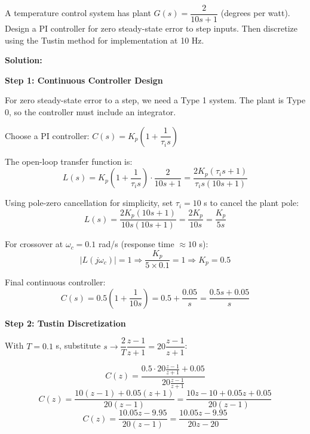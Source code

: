 \begin{example}
\label{ex:complete_design}
A temperature control system has plant $G(s) = \dfrac{2}{10s + 1}$ (degrees per watt). Design a PI controller for zero steady-state error to step inputs. Then discretize using the Tustin method for implementation at 10 Hz.

\textbf{Solution:}

\textbf{Step 1: Continuous Controller Design}

For zero steady-state error to a step, we need a Type 1 system. The plant is Type 0, so the controller must include an integrator.

Choose a PI controller: $C(s) = K_p\left(1 + \dfrac{1}{\tau_i s}\right)$

The open-loop transfer function is:
\begin{equation*}
L(s) = K_p\left(1 + \frac{1}{\tau_i s}\right) \cdot \frac{2}{10s + 1} = \frac{2K_p(\tau_i s + 1)}{\tau_i s(10s + 1)}
\end{equation*}

Using pole-zero cancellation for simplicity, set $\tau_i = 10$ s to cancel the plant pole:
\begin{equation*}
L(s) = \frac{2K_p(10s + 1)}{10s(10s + 1)} = \frac{2K_p}{10s} = \frac{K_p}{5s}
\end{equation*}

For crossover at $\omega_c = 0.1$ rad/s (response time $\approx 10$ s):
\begin{equation*}
|L(j\omega_c)| = 1 \Rightarrow \frac{K_p}{5 \times 0.1} = 1 \Rightarrow K_p = 0.5
\end{equation*}

Final continuous controller:
\begin{equation*}
C(s) = 0.5\left(1 + \frac{1}{10s}\right) = 0.5 + \frac{0.05}{s} = \frac{0.5s + 0.05}{s}
\end{equation*}

\textbf{Step 2: Tustin Discretization}

With $T = 0.1$ s, substitute $s \rightarrow \dfrac{2}{T}\dfrac{z-1}{z+1} = 20\dfrac{z-1}{z+1}$:

\begin{equation*}
C(z) = \frac{0.5 \cdot 20\frac{z-1}{z+1} + 0.05}{20\frac{z-1}{z+1}}
\end{equation*}
\begin{equation*}
C(z) = \frac{10(z-1) + 0.05(z+1)}{20(z-1)} = \frac{10z - 10 + 0.05z + 0.05}{20(z-1)}
\end{equation*}
\begin{equation*}
C(z) = \frac{10.05z - 9.95}{20(z-1)} = \frac{10.05z - 9.95}{20z - 20}
\end{equation*}


\end{example}
